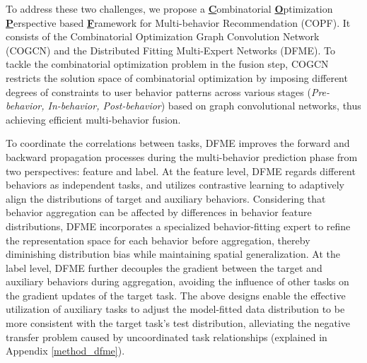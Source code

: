 To address these two challenges, we propose a \underline{\textbf{C}}ombinatorial \underline{\textbf{O}}ptimization \underline{\textbf{P}}erspective based \underline{\textbf{F}}ramework for Multi-behavior Recommendation (COPF). It consists of the Combinatorial Optimization Graph Convolution Network (COGCN) and the Distributed Fitting Multi-Expert Networks (DFME). To tackle the combinatorial optimization problem in the fusion step, COGCN restricts the solution space of combinatorial optimization by imposing different degrees of constraints to user behavior patterns across various stages (\textit{Pre-behavior, In-behavior, Post-behavior}) based on graph convolutional networks, thus achieving efficient multi-behavior fusion.


To coordinate the correlations between tasks, DFME improves the forward and backward propagation processes during the multi-behavior prediction phase from two perspectives: feature and label. At the feature level, DFME regards different behaviors as independent tasks, and utilizes contrastive learning to adaptively align the distributions of target and auxiliary behaviors. Considering that behavior aggregation can be affected by differences in behavior feature distributions, DFME incorporates a specialized behavior-fitting expert to refine the representation space for each behavior before aggregation, thereby diminishing distribution bias while maintaining spatial generalization. At the label level, DFME further decouples the gradient between the target and auxiliary behaviors during aggregation, avoiding the influence of other tasks on the gradient updates of the target task. The above designs enable the effective utilization of auxiliary tasks to adjust the model-fitted data distribution to be more consistent with the target task’s test distribution, alleviating the negative transfer problem caused by uncoordinated task relationships (explained in Appendix \ref{method_dfme}).

